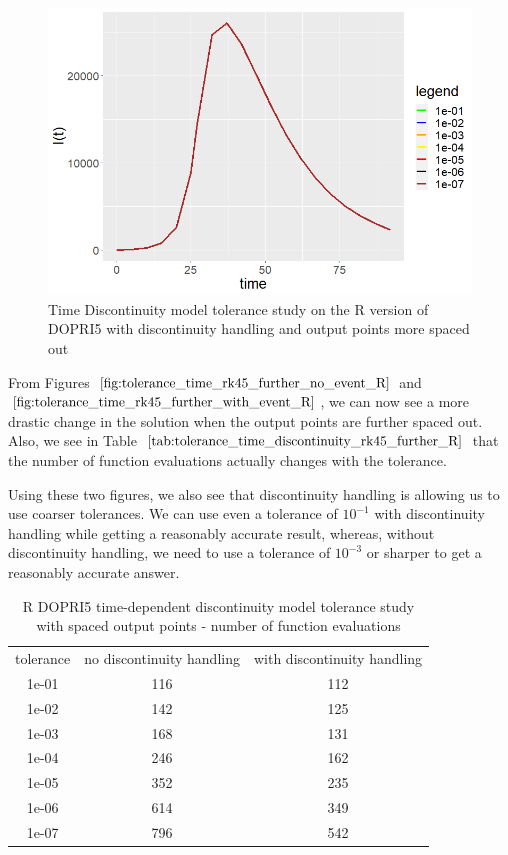 \begin{figure}[H]
\centering
\includegraphics[width=0.7\linewidth]{./figures/tolerance_time_rk45_further_with_event_R}
\caption{Time Discontinuity model tolerance study on the R version of DOPRI5 with discontinuity handling and output points more spaced out}
\label{fig:tolerance_time_rk45_further_with_event_R}
\end{figure}

From Figures $\ref{fig:tolerance_time_rk45_further_no_event_R}$ and $\ref{fig:tolerance_time_rk45_further_with_event_R}$, we can now see a more drastic change in the solution when the output points are further spaced out. Also, we see in Table $\ref{tab:tolerance_time_discontinuity_rk45_further_R}$ that the number of function evaluations actually changes with the tolerance.

Using these two figures, we also see that discontinuity handling is allowing us to use coarser tolerances. We can use even a tolerance of $10^{-1}$ with discontinuity handling while getting a reasonably accurate result, whereas, without discontinuity handling, we need to use a tolerance of $10^{-3}$ or sharper to get a reasonably accurate answer.

\begin{table}[H]
\caption {R DOPRI5 time-dependent discontinuity model tolerance study with spaced output points - number of function evaluations} \label{tab:tolerance_time_discontinuity_rk45_further_R} 
\begin{center}
\begin{tabular}{ c c c }
tolerance & no discontinuity handling & with discontinuity handling \\ 
1e-01 & 116 & 112 \\
1e-02 & 142 & 125 \\
1e-03 & 168 & 131 \\
1e-04 & 246 & 162 \\
1e-05 & 352 & 235 \\
1e-06 & 614 & 349 \\
1e-07 & 796 & 542 \\
\end{tabular}
\end{center}
\end{table}


